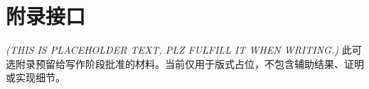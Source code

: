 \appendices
\section{附录接口}\label{app:interface}
\textit{(THIS IS PLACEHOLDER TEXT, PLZ FULFILL IT WHEN WRITING.)}
此可选附录预留给写作阶段批准的材料。当前仅用于版式占位，不包含辅助结果、证明或实现细节。
